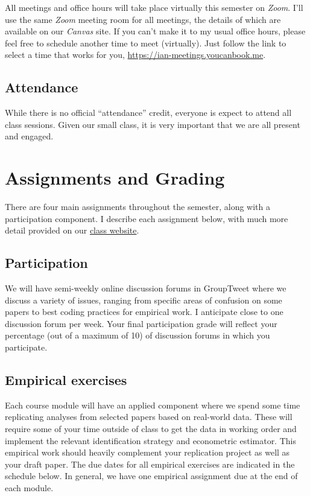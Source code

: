 \documentclass[11pt,]{article}
\begin{document}
All meetings and office hours will take place virtually this semester on
\emph{Zoom}. I'll use the same \emph{Zoom} meeting room for all
meetings, the details of which are available on our \emph{Canvas} site.
If you can't make it to my usual office hours, please feel free to
schedule another time to meet (virtually). Just follow the link to
select a time that works for you,
\url{https://ian-meetings.youcanbook.me}.

\hypertarget{attendance}{%
\subsection{Attendance}\label{attendance}}

While there is no official ``attendance'' credit, everyone is expect to
attend all class sessions. Given our small class, it is very important
that we are all present and engaged.

\hypertarget{assignments-and-grading}{%
\section{Assignments and Grading}\label{assignments-and-grading}}

There are four main assignments throughout the semester, along with a
participation component. I describe each assignment below, with much
more detail provided on our
\href{https://imccart.github.io/Econ-771/}{class website}.

\hypertarget{participation}{%
\subsection{Participation}\label{participation}}

We will have semi-weekly online discussion forums in GroupTweet where we
discuss a variety of issues, ranging from specific areas of confusion on
some papers to best coding practices for empirical work. I anticipate
close to one discussion forum per week. Your final participation grade
will reflect your percentage (out of a maximum of 10) of discussion
forums in which you participate.

\hypertarget{empirical-exercises}{%
\subsection{Empirical exercises}\label{empirical-exercises}}

Each course module will have an applied component where we spend some
time replicating analyses from selected papers based on real-world data.
These will require some of your time outside of class to get the data in
working order and implement the relevant identification strategy and
econometric estimator. This empirical work should heavily complement
your replication project as well as your draft paper. The due dates for
all empirical exercises are indicated in the schedule below. In general,
we have one empirical assignment due at the end of each module.
\end{document}
